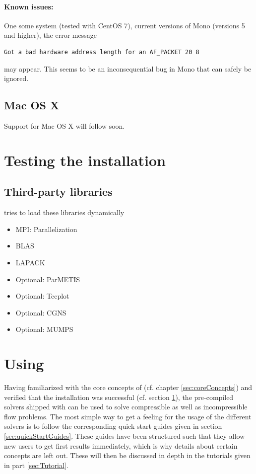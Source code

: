 \documentclass[a4paper,10pt]{report} %
\begin{document}
\paragraph{Known issues:}
One some system (tested with CentOS 7), current versions of Mono (versions 5 and higher), the error message
\begin{verbatim}
Got a bad hardware address length for an AF_PACKET 20 8
\end{verbatim}
may appear. This seems to be an inconsequential bug in Mono that can safely be ignored.


\subsection{Mac OS X}
Support for Mac OS X will follow soon.


\section{Testing the installation}
\label{sec:installation_testing}



\subsection{Third-party libraries}
\label{sec:installation_libraries}

\BoSSS{} tries to load these libraries dynamically
\begin{itemize}
	\item MPI: Parallelization
	\item BLAS
	\item LAPACK
	\item Optional: ParMETIS
	\item Optional: Tecplot
	\item Optional: CGNS
	\item Optional: MUMPS
\end{itemize}


\section{Using \BoSSS{}}
\label{sec:gettingStarted_using}

Having familiarized with the core concepts of \BoSSS{} (cf. chapter \ref{sec:coreConcepts}) and 
verified that the installation was successful (cf. section \ref{sec:installation_testing}), 
the pre-compiled solvers shipped with \BoSSS{} can be used to solve compressible as well as
 incompressible flow problems. The most simple way to get a feeling for the usage of the 
different solvers is to follow the corresponding quick start guides given in 
section \ref{sec:quickStartGuides}. These guides have been structured such that they allow new 
users to get first results immediately, which is why details about certain concepts are left out. 
These will then be discussed in depth in the tutorials given in part \ref{sec:Tutorial}.
\end{document}
